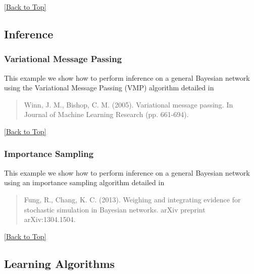 \documentclass[10pt,a4paper]{article}
\begin{document}
\hyperref[sec:bns]{[Back to Top]}\newline 


\subsection{Inference}\label{sec:bns:inference}

\subsubsection{Variational Message Passing}\label{sec:bns:inference:vmp}
This example we show how to perform inference on a general Bayesian network using the Variational Message Passing (VMP) algorithm detailed in

 \begin{quotation}
 	Winn, J. M., Bishop, C. M. (2005). Variational message passing. In Journal of Machine Learning Research (pp. 661-694).
 \end{quotation}

\hyperref[sec:bns]{[Back to Top]}\newline 



\subsubsection{Importance Sampling}\label{sec:bns:inference:sampling}
This example we show how to perform inference on a general Bayesian network using an importance sampling algorithm detailed in

\begin{quotation}
Fung, R., Chang, K. C. (2013). Weighing and integrating evidence for stochastic simulation in Bayesian networks. arXiv preprint arXiv:1304.1504.
\end{quotation}

\hyperref[sec:bns]{[Back to Top]}\newline 


\subsection{Learning Algorithms}\label{sec:bns:learning}
\end{document}

